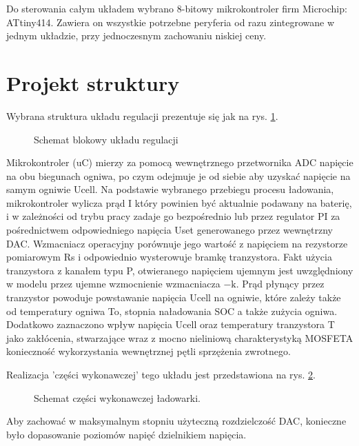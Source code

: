 \documentclass[polish,engineer]{polsl-msth}
\begin{document}
Do sterowania całym układem wybrano 8-bitowy mikrokontroler firm Microchip: ATtiny414. Zawiera on wszystkie potrzebne peryferia od razu zintegrowane w jednym układzie, przy jednoczesnym zachowaniu niskiej ceny. 
\section{Projekt struktury}
Wybrana struktura układu regulacji prezentuje się jak na rys. \ref{dia:reg_all}. 
\begin{figure}
     \resizebox{\linewidth}{!}{}
     \caption{Schemat blokowy układu regulacji\label{dia:reg_all}}
\end{figure}

Mikrokontroler (uC) mierzy za pomocą wewnętrznego przetwornika ADC napięcie na obu biegunach ogniwa, po czym odejmuje je od siebie aby uzyskać napięcie na samym ogniwie Ucell. Na podstawie wybranego przebiegu procesu ładowania, mikrokontroler wylicza prąd I który powinien być aktualnie podawany na baterię, i w zależności od trybu pracy zadaje go bezpośrednio lub przez regulator PI za pośrednictwem odpowiedniego napięcia Uset generowanego przez wewnętrzny DAC. Wzmacniacz operacyjny porównuje jego wartość z napięciem na rezystorze pomiarowym Rs i odpowiednio wysterowuje bramkę tranzystora. Fakt użycia tranzystora z kanałem typu P, otwieranego napięciem ujemnym jest uwzględniony w modelu przez ujemne wzmocnienie wzmacniacza $\mathrm{-k}$. Prąd płynący przez tranzystor powoduje powstawanie napięcia Ucell na ogniwie, które zależy także od temperatury ogniwa To, stopnia naładowania SOC a także zużycia ogniwa. Dodatkowo zaznaczono wpływ napięcia Ucell oraz temperatury tranzystora T jako zakłócenia, stwarzające wraz z mocno nieliniową charakterystyką MOSFETA konieczność wykorzystania wewnętrznej pętli sprzężenia zwrotnego.

Realizacja 'części wykonawczej' tego układu jest przedstawiona na rys. \ref{img:charging_circuit}. 
\begin{figure}[hbtp]
     \caption{Schemat części wykonawczej ładowarki. \label{img:charging_circuit}}
\end{figure}
Aby zachować w maksymalnym stopniu użyteczną rozdzielczość DAC, konieczne było dopasowanie poziomów napięć dzielnikiem napięcia.
\end{document}
